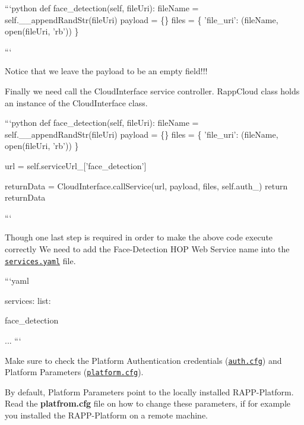 ```python def face\-\_\-detection(self, file\-Uri)\-: file\-Name = self.\-\_\-\-\_\-append\-Rand\-Str(file\-Uri) payload = \{\} files = \{ 'file\-\_\-uri'\-: (file\-Name, open(file\-Uri, 'rb')) \}

```

Notice that we leave the payload to be an empty field!!!

Finally we need call the Cloud\-Interface service controller. Rapp\-Cloud class holds an instance of the Cloud\-Interface class.

```python def face\-\_\-detection(self, file\-Uri)\-: file\-Name = self.\-\_\-\-\_\-append\-Rand\-Str(file\-Uri) payload = \{\} files = \{ 'file\-\_\-uri'\-: (file\-Name, open(file\-Uri, 'rb')) \}

url = self.\-service\-Url\-\_\-\mbox{[}'face\-\_\-detection'\mbox{]}

return\-Data = Cloud\-Interface.\-call\-Service(url, payload, files, self.\-auth\-\_\-) return return\-Data

```

Though one last step is required in order to make the above code execute correctly We need to add the Face-\/\-Detection H\-O\-P Web Service name into the \href{https://github.com/rapp-project/rapp-api/blob/master/python/RappCloud/config/services.yaml}{\tt services.\-yaml} file.

```yaml

services\-: list\-:
\begin{DoxyItemize}
\item face\-\_\-detection
\end{DoxyItemize}

... ```

Make sure to check the Platform Authentication credentials (\href{https://github.com/rapp-project/rapp-api/blob/master/python/RappCloud/config/auth.cfg}{\tt auth.\-cfg}) and Platform Parameters (\href{https://github.com/rapp-project/rapp-api/blob/master/python/RappCloud/config/platform.cfg}{\tt platform.\-cfg}).

By default, Platform Parameters point to the locally installed R\-A\-P\-P-\/\-Platform. Read the {\bfseries platfrom.\-cfg} file on how to change these parameters, if for example you installed the R\-A\-P\-P-\/\-Platform on a remote machine. 